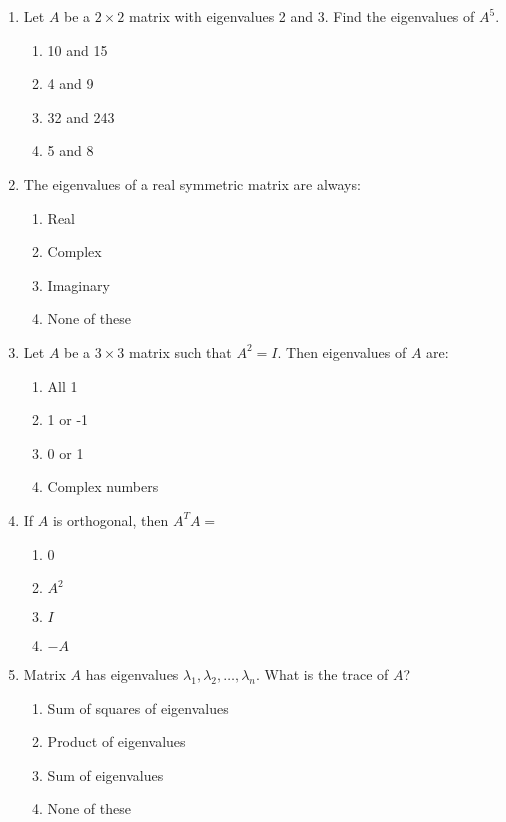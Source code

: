 \begin{enumerate}
\newpage
\item Let \( A \) be a \( 2 \times 2 \) matrix with eigenvalues 2 and 3. Find the eigenvalues of \( A^5 \).

\begin{enumerate}[label=(\alph*)]
\item 10 and 15 
\item 4 and 9 
\item 32 and 243 
\item 5 and 8
\end{enumerate}

\item The eigenvalues of a real symmetric matrix are always:

\begin{enumerate}[label=(\alph*)]
\item Real 
\item Complex 
\item Imaginary 
\item None of these
\end{enumerate}

\item Let \( A \) be a \( 3 \times 3 \) matrix such that \( A^2 = I \). Then eigenvalues of \( A \) are:

\begin{enumerate}[label=(\alph*)]
\item All 1 
\item 1 or -1 
\item 0 or 1 
\item Complex numbers
\end{enumerate}

\item If \( A \) is orthogonal, then \( A^T A = \)

\begin{enumerate}[label=(\alph*)]
\item 0 \quad \item \( A^2 \) \quad \item \( I \) \quad \item \( -A \)
\end{enumerate}

\item Matrix \( A \) has eigenvalues \( \lambda_1, \lambda_2, \dots, \lambda_n \). What is the trace of \( A \)?

\begin{enumerate}[label=(\alph*)]
\item Sum of squares of eigenvalues 
\item Product of eigenvalues 
\item Sum of eigenvalues 
\item None of these
\end{enumerate}


\end{enumerate}

